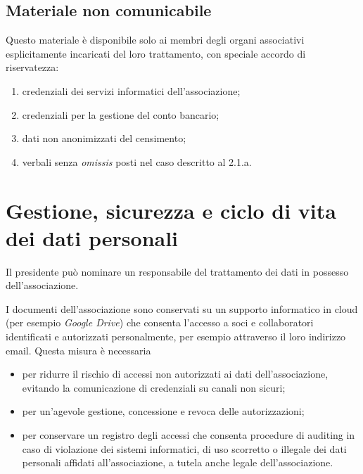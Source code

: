 \subsection{Materiale non comunicabile}\label{materiale-non-comunicabile}

Questo materiale è disponibile solo ai membri degli organi associativi
esplicitamente incaricati del loro trattamento,
con speciale accordo di riservatezza:

\begin{enumerate}
    \item
        credenziali dei servizi informatici dell'associazione;
    \item
        credenziali per la gestione del conto bancario;
    \item
        dati non anonimizzati del censimento;
    \item
        verbali senza \emph{omissis} posti nel caso descritto al 2.1.a.
\end{enumerate}

\section{Gestione, sicurezza e ciclo di vita dei dati personali}

Il presidente può nominare un responsabile del trattamento dei dati in possesso
dell'associazione.

I documenti dell'associazione sono conservati su un supporto informatico in
cloud (per esempio \emph{Google Drive}) che consenta l'accesso a soci e
collaboratori identificati e autorizzati personalmente, per esempio
attraverso il loro indirizzo email.
Questa misura è necessaria 
\begin{itemize}
    \item per ridurre il rischio di accessi non
autorizzati ai dati dell'associazione, evitando la comunicazione di
credenziali su canali non sicuri;
\item per un'agevole gestione, concessione e revoca delle autorizzazioni;
\item per conservare un registro degli accessi che consenta procedure di
    auditing in caso di violazione dei sistemi informatici, di uso scorretto
    o illegale dei dati personali affidati all'associazione, a tutela anche
    legale dell'associazione.
\end{itemize}

